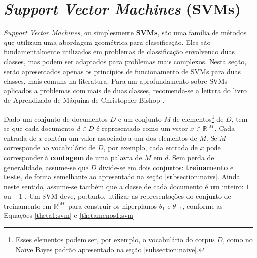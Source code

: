  

\section{\emph{Support Vector Machines} (SVMs)}
\label{subsection:SVMs}

\emph{Support Vector Machines}, ou simplesmente \textbf{SVMs}, são uma família de métodos que utilizam uma abordagem geométrica para classificação. Eles são fundamentalmente utilizados em problemas de classificação envolvendo duas classes, mas podem ser adaptados para problemas mais complexos. Nesta seção, serão apresentados apenas os princípios de funcionamento de SVMs para duas classes, mais comuns na literatura. Para um aprofundamento sobre SVMs aplicados a problemas com mais de duas classes, recomenda-se a leitura do livro de Aprendizado de Máquina de Christopher Bishop \cite{bishop}.

Dado um conjunto de documentos \ensuremath{D} e um conjunto \ensuremath{M} de elementos\footnote{Esses elementos podem ser, por exemplo, o vocabulário do corpus \ensuremath{D}, como no Naïve Bayes padrão apresentado na seção \ref{subsection:naive}.} de \ensuremath{D}, tem-se que cada documento \ensuremath{d \in D} é representado como um vetor \ensuremath{x \in \mathbb{R}^{|M|}}. Cada entrada de \ensuremath{x} contém um valor associado a um dos elementos de \ensuremath{M}. Se \ensuremath{M} corresponde ao vocabulário de \ensuremath{D}, por exemplo, cada entrada de \ensuremath{x} pode corresponder à \textbf{contagem} de uma palavra de \ensuremath{M} em \ensuremath{d}. Sem perda de generalidade, assume-se que \ensuremath{D} divide-se em dois conjuntos: \textbf{treinamento} e \textbf{teste}, de forma semelhante ao apresentado na seção \ref{subsection:naive}. Ainda neste sentido, assume-se também que a classe de cada documento é um inteiro: \ensuremath{1} ou \ensuremath{-1} \cite{mono-puc}. Um SVM deve, portanto, utilizar as representações do conjunto de treinamento em \ensuremath{\mathbb{R}^{|M|}} para construir os hiperplanos \ensuremath{\theta_1} e \ensuremath{\theta_{-1}}, conforme as Equações \ref{theta1:svm} e \ref{thetamenos1:svm} \cite{mono-puc}

